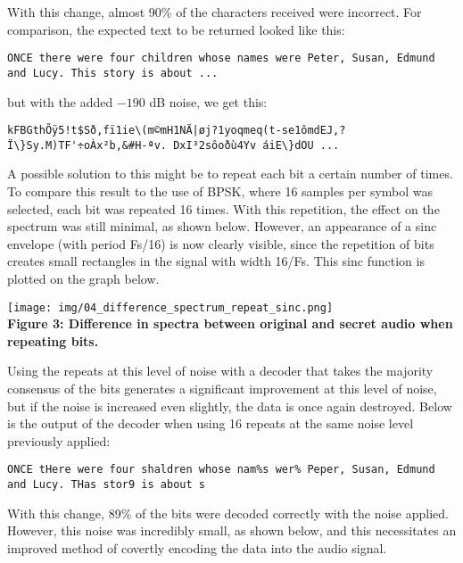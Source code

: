 \documentclass{article}
\begin{document}
\inputminted[xleftmargin=24pt, linenos=true, breaklines, firstline=38, lastline=39]{matlab}{project_code.m}

With this change, almost 90\% of the characters received were incorrect. For
comparison, the expected text to be returned looked like this:

\begin{verbatim}
ONCE there were four children whose names were Peter, Susan, Edmund 
and Lucy. This story is about ...
\end{verbatim}

but with the added $-190$ dB noise, we get this:

\begin{verbatim}
kFBGthÕÿ5!t$Sð,fï1ie\(m©mH1NÄ|øj?1yoqmeq(t-se1ômdEJ,?Ï\}Sy.M)TF'÷oÀx²b,&#H-ªv. DxI³2sôoðù4Yv áiE\}dOU ...
\end{verbatim}

A possible solution to this might be to repeat each bit a certain number of
times. To compare this result to the use of BPSK, where 16 samples per
symbol was selected, each bit was repeated 16 times. With this repetition, the
effect on the spectrum was still minimal, as shown below. However, an appearance
of a sinc envelope (with period Fs/16) is now clearly visible, since the
repetition of bits creates small rectangles in the signal with width 16/Fs. This
sinc function is plotted on the graph below.

\begin{center}
  \texttt{[image: img/04\_difference\_spectrum\_repeat\_sinc.png]} \\
  \textbf{Figure 3: Difference in spectra between original and secret audio when repeating bits.}
\end{center}

Using the repeats at this level of noise with a decoder that takes the majority
consensus of the bits generates a significant improvement at this level of
noise, but if the noise is increased even slightly, the data is once again
destroyed. Below is the output of the decoder when using 16 repeats at the same
noise level previously applied:

\begin{verbatim}
ONCE tHere were four shaldren whose nam%s wer% Peper, Susan, Edmund 
and Lucy. THas stor9 is about s
\end{verbatim}

With this change, 89\% of the bits were decoded correctly with the noise
applied. However, this noise was incredibly small, as shown below, and this 
necessitates an improved method of covertly encoding the data into the audio
signal.
\end{document}
